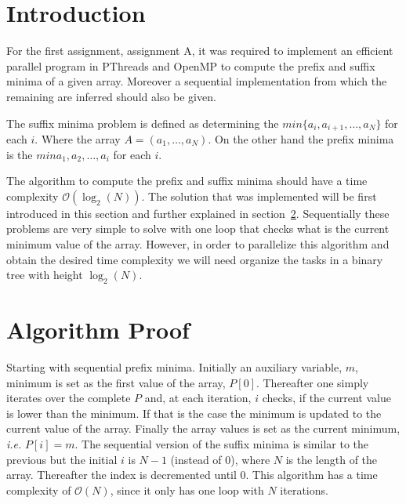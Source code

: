 \renewcommand{\O}{\mathcal{O}}


\section{Introduction}

For the first assignment, assignment A,  it was required to implement an efficient parallel program in PThreads and OpenMP to compute the prefix and suffix minima of a given array. Moreover a sequential implementation from which the remaining are inferred should also be given.

The suffix minima problem is defined as determining the $min\{a_i, a_{i+1},\dots,a_N\}$ for each $i$. Where the array $A = (a_1, \dots, a_N)$. On the other hand the prefix minima is the $min{a_1, a_2, \dots, a_i}$ for each $i$.

The algorithm to compute the prefix and suffix minima should have a time complexity $\O(\log_2(N))$. 
The solution that was implemented will be first introduced in this section and further explained in section~\ref{sec:proof}.
Sequentially these problems are very simple to solve with one loop that checks what is the current minimum value of the array. However, in order to parallelize this algorithm and obtain the desired time complexity we will need organize the tasks in a binary tree with height $\log_2(N)$.

\section{Algorithm Proof}
\label{sec:proof}


Starting with sequential prefix minima. Initially an auxiliary variable, $m$, minimum is set as the first value of the array, $P[0]$. Thereafter one simply iterates over the complete $P$ and, at each iteration, $i$ checks, if the current value is lower than the minimum. If that is the case the minimum is updated to the current value of the array. Finally the array values is set as the current minimum, \emph{i.e.} $P[i] = m$.
The sequential version of the suffix minima is similar to the previous but the initial $i$ is $N-1$ (instead of $0$), where $N$ is the length of the array. Thereafter the index is decremented until 0.
This algorithm has a time complexity of $\O(N)$, since it only has one loop with $N$ iterations.


